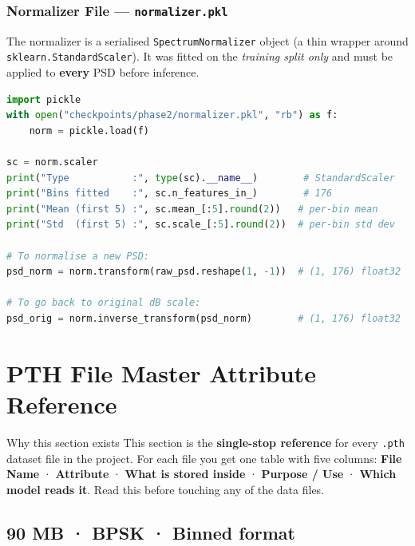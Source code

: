 \documentclass[11pt,a4paper]{article}
\begin{document}
\subsubsection{Normalizer File — \texttt{normalizer.pkl}}

The normalizer is a serialised \texttt{SpectrumNormalizer} object
(a thin wrapper around \texttt{sklearn.StandardScaler}).
It was fitted on the \emph{training split only} and must be applied
to \textbf{every} PSD before inference.

\begin{lstlisting}[language=Python, caption=Inspecting the normalizer]
import pickle
with open("checkpoints/phase2/normalizer.pkl", "rb") as f:
    norm = pickle.load(f)

sc = norm.scaler
print("Type           :", type(sc).__name__)        # StandardScaler
print("Bins fitted    :", sc.n_features_in_)        # 176
print("Mean (first 5) :", sc.mean_[:5].round(2))   # per-bin mean
print("Std  (first 5) :", sc.scale_[:5].round(2))  # per-bin std dev

# To normalise a new PSD:
psd_norm = norm.transform(raw_psd.reshape(1, -1))  # (1, 176) float32

# To go back to original dB scale:
psd_orig = norm.inverse_transform(psd_norm)        # (1, 176) float32
\end{lstlisting}


\section{PTH File Master Attribute Reference}

\begin{tip}{Why this section exists}
This section is the \textbf{single-stop reference} for every \texttt{.pth}
dataset file in the project. For each file you get one table with five
columns: \textbf{File Name} · \textbf{Attribute} · \textbf{What is
stored inside} · \textbf{Purpose / Use} · \textbf{Which model reads it}.
Read this before touching any of the data files.
\end{tip}

\subsection*{
\hfill\small 90 MB · BPSK · Binned format}
\end{document}
